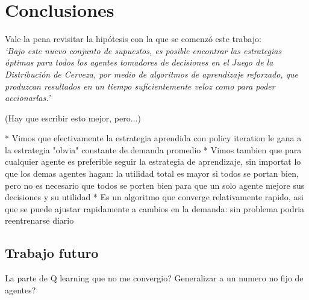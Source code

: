 \chapter{Conclusiones}

Vale la pena revisitar la hip\'otesis con la que se comenz\'o este trabajo:\\

\textit{`Bajo este nuevo conjunto de supuestos, es posible encontrar las estrategias \'optimas para todos los agentes tomadores de decisiones en el Juego de la Distribuci\'on de Cerveza, por medio de algoritmos de aprendizaje reforzado, que produzcan resultados en un tiempo suficientemente veloz como para poder accionarlas.'}

(Hay que escribir esto mejor, pero...)

* Vimos que efectivamente la estrategia aprendida con policy iteration le gana a la estrategia "obvia" constante de demanda promedio
* Vimos tambien que para cualquier agente es preferible seguir la estrategia de aprendizaje, sin importat lo que los demas agentes hagan: la utilidad total es mayor si todos se portan bien, pero no es necesario que todos se porten bien para que un solo agente mejore sus decisiones y su utilidad
* Es un algoritmo que converge relativamente rapido, asi que se puede ajustar rapidamente a cambios en la demanda: sin problema podria reentrenarse diario 



\section{Trabajo futuro}

La parte de Q learning que no me convergio?
Generalizar a un numero no fijo de agentes?

